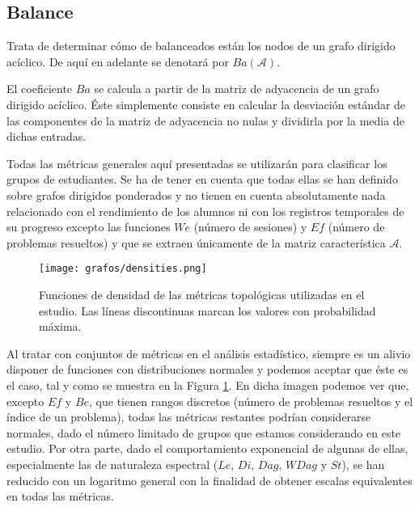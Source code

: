 \subsection{Balance}

Trata de determinar cómo de balanceados están los nodos de un grafo dirigido acíclico. De aquí en adelante se denotará por $Ba(\mathcal{A})$.

El coeficiente $Ba$ se calcula a partir de la matriz de adyacencia de un grafo dirigido acíclico. Éste simplemente consiste en calcular la desviación estándar de las componentes de la matriz de adyacencia no nulas y dividirla por la media de dichas entradas.

Todas las métricas generales aquí presentadas se utilizarán para clasificar los grupos de estudiantes. Se ha de tener en cuenta que todas ellas se han definido sobre grafos dirigidos ponderados y no tienen en cuenta absolutamente nada relacionado con el rendimiento de los alumnos ni con los registros temporales de su progreso excepto las funciones $We$ (número de sesiones) y $Ef$ (número de problemas resueltos) y que se extraen únicamente de la matriz característica $\mathcal{A}$.

\begin{figure}[H]
    \centering
    \texttt{[image: grafos/densities.png]}
    \caption{Funciones de densidad de las métricas topológicas utilizadas en el estudio. Las líneas discontinuas marcan los valores con probabilidad máxima.}
    \label{fig:densities}
\end{figure}

Al tratar con conjuntos de métricas en el análisis estadístico, siempre es un alivio disponer de funciones con distribuciones normales y podemos aceptar que éste es el caso, tal y como se muestra en la Figura \ref{fig:densities}. En dicha imagen podemos ver que, excepto $Ef$ y $Be$, que tienen rangos discretos (número de problemas resueltos y el índice de un problema), todas las métricas restantes podrían considerarse normales, dado el número limitado de grupos que estamos considerando en este estudio. Por otra parte, dado el comportamiento exponencial de algunas de ellas, especialmente las de naturaleza espectral ($Le$, $Di$, $Dag$, $WDag$ y $St$), se han reducido con un logaritmo general con la finalidad de obtener escalas equivalentes en todas las métricas.